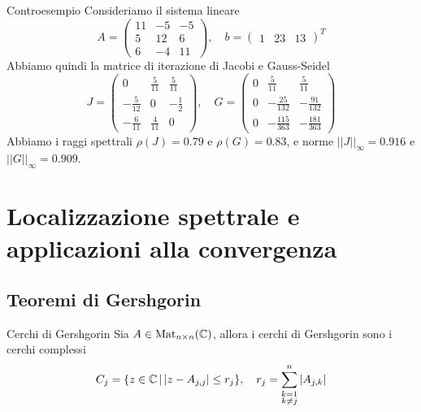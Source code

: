 \documentclass[a4paper]{article}
\begin{document}
\begin{snippetexample}{Controesempio}
    Consideriamo il sistema lineare
    \[
        A =
        \begin{pmatrix}
            11 & -5 & -5 \\
            5 & 12 & 6 \\
            6 & -4 & 11
        \end{pmatrix}, \quad b=
        \begin{pmatrix}
            1 & 23 & 13
        \end{pmatrix}^T
    \]
    Abbiamo quindi la matrice di iterazione di Jacobi e Gauss-Seidel
    \[
        J =
        \begin{pmatrix}
            0 & \frac5{11} & \frac{5}{11} \\
            -\frac{5}{12} & 0 & -\frac12 \\
            -\frac{6}{11} & \frac{4}{11} & 0
        \end{pmatrix}, \quad
        G =
        \begin{pmatrix}
            0 & \frac5{11} & \frac5{11} \\
            0 & -\frac{25}{132} & -\frac{91}{132} \\
            0 & -\frac{115}{363} & -\frac{181}{363}
        \end{pmatrix}
    \]
    Abbiamo i raggi spettrali \(\rho(J) = 0.79\)
    e \(\rho(G) = 0.83\), e norme
    \(||J||_{\infty} = 0.916\) e \(||G||_{\infty} = 0.909\).
\end{snippetexample}

\pagebreak

\section{Localizzazione spettrale e applicazioni alla convergenza}

\subsection{Teoremi di Gershgorin}

\begin{snippetdefinition}{Cerchi di Gershgorin}
    Sia \(A \in \operatorname{Mat}_{n \times n}(\mathbb{C})\), allora i cerchi di Gershgorin
    sono i cerchi complessi
    \[
        C_j = \{
            z \in \mathbb{C} \,|\,
            |z-A_{j,j}| \leq r_j
        \}, \quad r_j = \sum_{\substack{k=1 \\ k \neq j}}^n |A_{j,k}|
    \]
\end{snippetdefinition}
\end{document}
